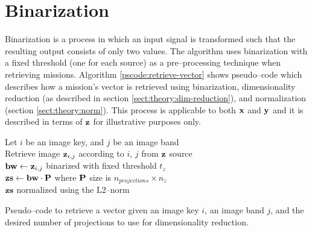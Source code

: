\section{Binarization} \label{sect:meth:binarization}

Binarization is a process in which an input signal is transformed such that the resulting output consists of only two values. The \mlblink algorithm uses binarization with a fixed threshold (one for each source) as a pre--processing technique when retrieving missions. Algorithm \ref{pscode:retrieve-vector} shows pseudo--code which describes how a mission's vector is retrieved using binarization, dimensionality reduction (as described in section \ref{sect:theory:dim-reduction}), and normalization (section \ref{sect:theory:norm}). This process is applicable to both $\boldsymbol{\mathbf{x}}$ and $\boldsymbol{\mathbf{y}}$ and it is described in terms of $\boldsymbol{\mathbf{z}}$ for illustrative purposes only.

\vspace{0.4cm}
\begin{algorithm}[H]
    \SetAlgoLined
         {
            Let $i$ be an image key, and $j$ be an image band \\
            Retrieve image $\boldsymbol{\mathbf{z}}_{i,j}$ according to $i$, $j$ from $\boldsymbol{\mathbf{z}}$ source \\
            $\boldsymbol{\mathbf{bw}} \gets \boldsymbol{\mathbf{z}}_{i,j}$ binarized with fixed threshold $t_z$ \\
            $\boldsymbol{\mathbf{zs}} \gets \boldsymbol{\mathbf{bw}} \cdot \boldsymbol{\mathbf{P}}$ where $\boldsymbol{\mathbf{P}}$ size is $n_{projections} \times n_z$ \\
            \Return $\boldsymbol{\mathbf{zs}}$ normalized using the L2--norm
        }
    \caption{Pseudo--code to retrieve a vector given an image key $i$, an image band $j$, and the desired number of projections to use for dimensionality reduction.}
    \label{pscode:retrieve-vector}
\end{algorithm}
\vspace{0.4cm}